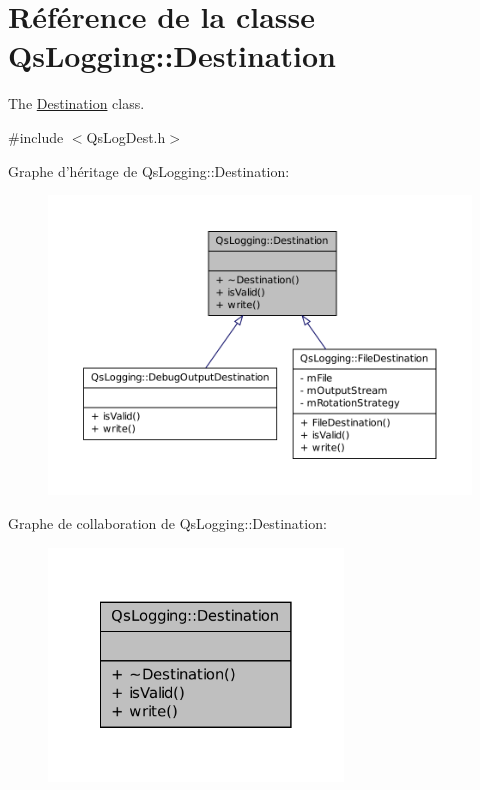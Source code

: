 \hypertarget{classQsLogging_1_1Destination}{\section{Référence de la classe Qs\-Logging\-:\-:Destination}
\label{classQsLogging_1_1Destination}
}


The \hyperlink{classQsLogging_1_1Destination}{Destination} class.  




{\ttfamily \#include $<$Qs\-Log\-Dest.\-h$>$}



Graphe d'héritage de Qs\-Logging\-:\-:Destination\-:
\nopagebreak
\begin{figure}[H]
\begin{center}
\leavevmode
\includegraphics[width=350pt]{classQsLogging_1_1Destination__inherit__graph}
\end{center}
\end{figure}


Graphe de collaboration de Qs\-Logging\-:\-:Destination\-:
\nopagebreak
\begin{figure}[H]
\begin{center}
\leavevmode
\includegraphics[width=222pt]{classQsLogging_1_1Destination__coll__graph}
\end{center}
\end{figure}
